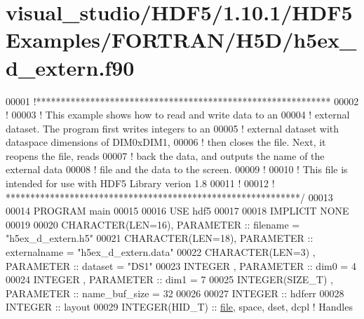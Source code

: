 \hypertarget{visual__studio_2_h_d_f5_21_810_81_2_h_d_f5_examples_2_f_o_r_t_r_a_n_2_h5_d_2h5ex__d__extern_8f90_source}{}\section{visual\+\_\+studio/\+H\+D\+F5/1.10.1/\+H\+D\+F5\+Examples/\+F\+O\+R\+T\+R\+A\+N/\+H5\+D/h5ex\+\_\+d\+\_\+extern.f90}
\label{visual__studio_2_h_d_f5_21_810_81_2_h_d_f5_examples_2_f_o_r_t_r_a_n_2_h5_d_2h5ex__d__extern_8f90_source}

\begin{DoxyCode}
00001 \textcolor{comment}{!************************************************************}
00002 \textcolor{comment}{!}
00003 \textcolor{comment}{!  This example shows how to read and write data to an}
00004 \textcolor{comment}{!  external dataset.  The program first writes integers to an}
00005 \textcolor{comment}{!  external dataset with dataspace dimensions of DIM0xDIM1,}
00006 \textcolor{comment}{!  then closes the file.  Next, it reopens the file, reads}
00007 \textcolor{comment}{!  back the data, and outputs the name of the external data}
00008 \textcolor{comment}{!  file and the data to the screen.}
00009 \textcolor{comment}{!}
00010 \textcolor{comment}{!  This file is intended for use with HDF5 Library verion 1.8}
00011 \textcolor{comment}{!}
00012 \textcolor{comment}{! ************************************************************/}
00013 
00014 \textcolor{keyword}{PROGRAM} main
00015 
00016   \textcolor{keywordtype}{USE }hdf5
00017 
00018   \textcolor{keywordtype}{IMPLICIT NONE}
00019 
00020   \textcolor{keywordtype}{CHARACTER(LEN=16)}, \textcolor{keywordtype}{PARAMETER} :: filename     = \textcolor{stringliteral}{"h5ex\_d\_extern.h5"}
00021   \textcolor{keywordtype}{CHARACTER(LEN=18)}, \textcolor{keywordtype}{PARAMETER} :: externalname = \textcolor{stringliteral}{"h5ex\_d\_extern.data"}
00022   \textcolor{keywordtype}{CHARACTER(LEN=3)} , \textcolor{keywordtype}{PARAMETER} :: dataset  = \textcolor{stringliteral}{"DS1"}
00023   \textcolor{keywordtype}{INTEGER}          , \textcolor{keywordtype}{PARAMETER} :: dim0     = 4
00024   \textcolor{keywordtype}{INTEGER}          , \textcolor{keywordtype}{PARAMETER} :: dim1     = 7
00025   \textcolor{keywordtype}{INTEGER(SIZE\_T)}  , \textcolor{keywordtype}{PARAMETER} :: name\_buf\_size = 32
00026 
00027   \textcolor{keywordtype}{INTEGER} :: hdferr
00028   \textcolor{keywordtype}{INTEGER} :: layout
00029   \textcolor{keywordtype}{INTEGER(HID\_T)}  :: \hyperlink{structfile}{file}, space, dset, dcpl \textcolor{comment}{! Handles}

\end{DoxyCode}
